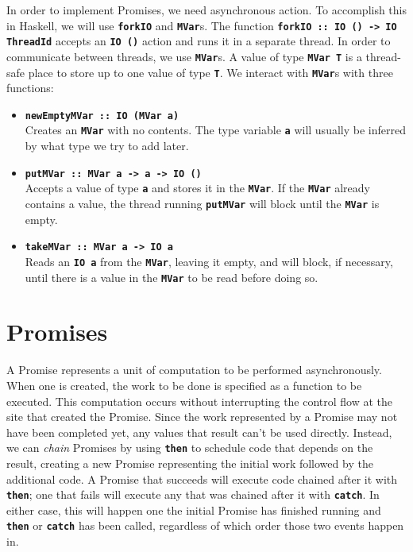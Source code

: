 \documentclass[12pt, english, letterpaper]{kuthesis}
\newcommand{\lit}[1]{\textbf{\texttt{#1}}}
\begin{document}
In order to implement \textsf{Promises}, we need asynchronous action.  To accomplish this in Haskell, we will use \lit{forkIO} and \lit{MVar}s.  The function \lit{forkIO ::\ IO () -> IO ThreadId} accepts an \lit{IO ()} action and runs it in a separate thread.  In order to communicate between threads, we use \lit{MVar}s.  A value of type \lit{MVar T} is a thread-safe place to store up to one value of type \lit T.  We interact with \lit{MVar}s with three functions:
\begin{itemize}
\item \lit{newEmptyMVar ::\ IO (MVar a)} \\
  Creates an \lit{MVar} with no
  contents.  The type variable \lit a will usually be inferred by what
  type we try to add later.
\item \lit{putMVar ::\ MVar a -> a -> IO ()}\\
  Accepts a value of type \lit a and stores it in the \lit{MVar}.  If
  the \lit{MVar} already contains a value, the thread running
  \lit{putMVar} will block until the \lit{MVar} is empty.
\item \lit{takeMVar ::\ MVar a -> IO a} \\
  Reads an \lit{IO a} from the
  \lit{MVar}, leaving it empty, and will block, if necessary, until
  there is a value in the \lit{MVar} to be read before doing so.
\end{itemize}
\section*{Promises}

A \textsf{Promise} represents a unit of computation to be performed asynchronously.  When one is created, the work to be done is specified as a function to be executed.  This computation occurs without interrupting the control flow at the site that created the \textsf{Promise}.  Since the work represented by a \textsf{Promise} may not have been completed yet, any values that result can't be used directly.  Instead, we can \emph{chain} \textsf{Promises} by using \lit{then} to schedule code that depends on the result, creating a new \textsf{Promise} representing the initial work followed by the additional code.  A \textsf{Promise} that succeeds will execute code chained after it with \lit{then}; one that fails will execute any that was chained after it with \lit{catch}.  In either case, this will happen one the initial \textsf{Promise} has finished running and \lit{then} or \lit{catch} has been called, regardless of which order those two events happen in.
\end{document}
